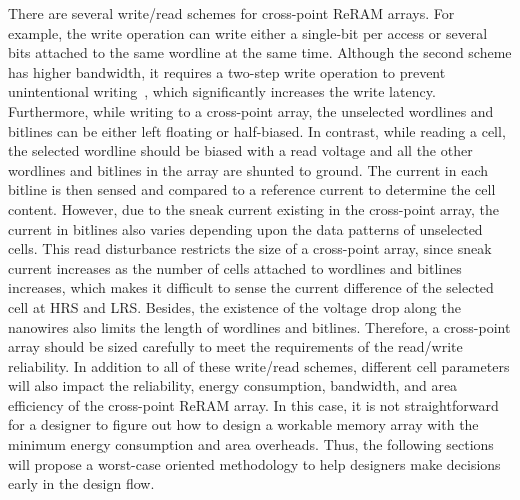 There are several write/read schemes for cross-point ReRAM arrays. For
example, the write operation can write either a single-bit per access or
several bits attached to the same wordline at the same time. Although the second
scheme has higher bandwidth, it requires a two-step write operation to
prevent unintentional writing~\cite{memristor:Cong}, which significantly
increases the write latency.
Furthermore, while writing to a cross-point array, the unselected wordlines
and bitlines can be either left floating or half-biased. In contrast, while reading
a cell, the selected wordline should be biased with a read
voltage and all the other wordlines and bitlines in the array are shunted
to ground. The current in each bitline is then sensed and compared to a
reference current to determine the cell content. However, due to the sneak
current existing in the cross-point array, the current in bitlines also
varies depending upon the data patterns of unselected cells.
This read disturbance restricts the size of a cross-point array, since
sneak current increases as the number of cells attached to wordlines and
bitlines increases, which makes it difficult to sense the current
difference of the selected cell at HRS and LRS. Besides, the existence of
the voltage drop along the nanowires also limits the length of wordlines
and bitlines. Therefore, a cross-point array should be sized carefully to
meet the requirements of the read/write reliability.
In addition to all of these write/read schemes, different cell parameters
will also impact the reliability, energy consumption, bandwidth, and area
efficiency of the cross-point ReRAM array. In this case, it is not
straightforward for a designer to figure out how to design a workable
memory array with the minimum energy consumption and area overheads. Thus,
the following sections will propose a worst-case oriented methodology to
help designers make decisions early in the design flow.



